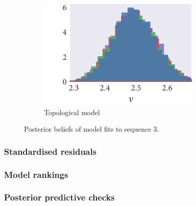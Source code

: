 \begin{figure}[p]
\begin{subfigure}[b]{\textwidth}
    \includegraphics{seq3/top_hist_nu.pdf}%
    \caption{Topological model}
  \end{subfigure}
  \caption{Posterior beliefs of model fits to sequence $3$.}
\end{figure}

\subsubsection{Standardised residuals}

\subsubsection{Model rankings}

\subsubsection{Posterior predictive checks}



